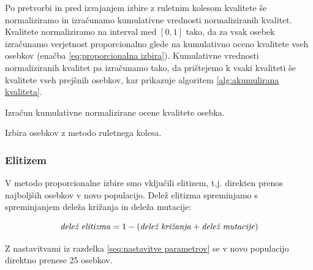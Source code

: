 \documentclass[a4paper, 12pt]{book}
\begin{document}
Po pretvorbi in pred izvajanjem izbire z ruletnim kolesom kvalitete \v se normaliziramo in izra\v cunamo kumulativne vrednosti normaliziranih kvalitet. Kvalitete normaliziramo na interval med $[0, 1]$ tako, da za vsak osebek izra\v cunamo verjetnost proporcionalno glede na kumulativno oceno kvalitete vseh osebkov (ena\v cba  \ref{eq:proporcionalna izbira}).
Kumulativne vrednosti normaliziranih kvalitet pa izra\v cunamo tako, da pri\v stejemo k vsaki kvaliteti \v se kvalitete vseh prej\v snih osebkov, kar prikazuje algoritem \ref{alg:akumulirana kvaliteta}. 

\begin{algorithm}
\SetAlgoLined
{}
\caption{Izra\v cun kumulativne normalizirane ocene kvalitete osebka.}
\label{alg:akumulirana kvaliteta}
\end{algorithm}

\begin{algorithm}
\caption{Izbira osebkov z metodo ruletnega kolesa.}
\label{alg:ruletno kolo}
\end{algorithm}

\newpage
\subsubsection{Elitizem}

V metodo proporcionalne izbire smo vklju\v cili elitizem, t.j. direkten prenos najbolj\v sih osebkov v novo populacijo. Dele\v z elitizma spreminjamo s spreminjanjem dele\v za kri\v zanja in dele\v za mutacije:

\begin{equation}
\label{eq:elitizem}
\textrm{\textit{dele\v z elitizma}} = 1 - (\textrm{\textit{dele\v z kri\v zanja}} + \textrm{\textit{dele\v z mutacije}})
\end{equation}

Z nastavitvami iz razdelka \ref{seq:nastavitve parametrov} se v novo populacijo direktno prenese 25 osebkov.
\end{document}
